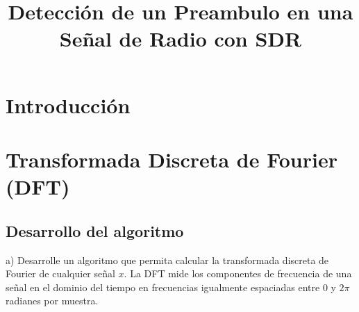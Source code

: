 \documentclass[conference,compsoc]{IEEEtran}
\begin{document}
\title{\LARGE Detección de un Preambulo en una Señal de Radio con SDR}

\author{
}

\maketitle

\begin{abstract}

\end{abstract}


\begin{IEEEkeywords}

\end{IEEEkeywords}


\section{Introducción}


\section{Transformada Discreta de Fourier (DFT)}

\subsection{Desarrollo del algoritmo}

a) Desarrolle un algoritmo que permita calcular la transformada discreta de Fourier de cualquier señal \( x \). La DFT mide los componentes de frecuencia de una señal en el dominio del tiempo en frecuencias igualmente espaciadas entre \( 0 \) y \( 2\pi \) radianes por muestra.
\end{document}
